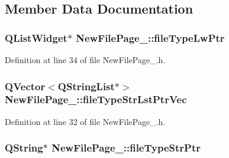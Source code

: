 \subsection{Member Data Documentation}
\hypertarget{class_new_file_page__1_a4886ed76812d01820e2868006b8cde72}{
\subsubsection[{file\-Type\-Lw\-Ptr}]{\setlength{\rightskip}{0pt plus 5cm}Q\-List\-Widget$\ast$ New\-File\-Page\-\_\-::file\-Type\-Lw\-Ptr\hspace{0.3cm}{\ttfamily [private]}}}\label{class_new_file_page__1_a4886ed76812d01820e2868006b8cde72}


Definition at line 34 of file New\-File\-Page\-\_.\-h.

\hypertarget{class_new_file_page__1_a5c348b3e762867bc02861bd317eb4964}{
\subsubsection[{file\-Type\-Str\-Lst\-Ptr\-Vec}]{\setlength{\rightskip}{0pt plus 5cm}Q\-Vector$<$Q\-String\-List$\ast$$>$ New\-File\-Page\-\_\-::file\-Type\-Str\-Lst\-Ptr\-Vec\hspace{0.3cm}{\ttfamily [private]}}}\label{class_new_file_page__1_a5c348b3e762867bc02861bd317eb4964}


Definition at line 32 of file New\-File\-Page\-\_.\-h.

\hypertarget{class_new_file_page__1_ac03bd12c5904b2a858137bf7bb93502c}{
\subsubsection[{file\-Type\-Str\-Ptr}]{\setlength{\rightskip}{0pt plus 5cm}Q\-String$\ast$ New\-File\-Page\-\_\-::file\-Type\-Str\-Ptr\hspace{0.3cm}{\ttfamily [private]}}}\label{class_new_file_page__1_ac03bd12c5904b2a858137bf7bb93502c}


